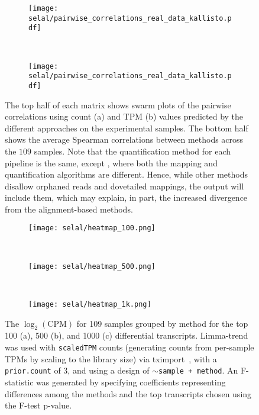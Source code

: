 \begin{figure}[h!]
    \centering
    \begin{subfigure}[t]{0.7\textwidth}
        \centering
  	  	 \texttt{[image: selal/pairwise\_correlations\_real\_data\_kallisto.pdf]}
		\caption{}
    \end{subfigure}
    ~ 
    \begin{subfigure}[t]{0.7\textwidth}
        \centering
  	  	\texttt{[image: selal/pairwise\_correlations\_real\_data\_kallisto.pdf]}
		\caption{}
    \end{subfigure}
    \caption{The top half of each matrix shows swarm plots of the pairwise correlations using count (a) and TPM (b) values
        predicted by the different approaches on the experimental samples. The
        bottom half shows the average Spearman correlations between methods
        across the $109$ samples. Note that the quantification method for each
        pipeline is the same, except \kallisto, where both the mapping and
        quantification algorithms are different. Hence, while other methods
        disallow orphaned reads and dovetailed mappings, the \kallisto output
        will include them, which may explain, in part, the increased divergence
        from the alignment-based methods.}
    \label{fig:kallisto}
\end{figure}

\begin{figure}[t!]
    \centering
    \begin{subfigure}[t]{0.45\textwidth}
        \centering
	    \texttt{[image: selal/heatmap\_100.png]}
	    \caption{}
    \end{subfigure}
    ~
    \begin{subfigure}[t]{0.45\textwidth}
        \centering
	    \texttt{[image: selal/heatmap\_500.png]}
	    \caption{}
    \end{subfigure}
    ~
     \begin{subfigure}[t]{0.45\textwidth}
     \centering
	    \texttt{[image: selal/heatmap\_1k.png]}
	    \caption{}
    \end{subfigure}
    \caption{The $\log_2(\text{CPM})$ for 109 samples grouped by
      method for the top 100 (a), 500 (b), and 1000 (c) differential transcripts. 
      Limma-trend was used with \texttt{scaledTPM} counts 
	(generating counts from per-sample TPMs by scaling to the library size) via
	tximport~\citep{soneson2015differential}, with a \texttt{prior.count} of
	3, and using a design of \texttt{$\sim$sample + method}. An F-statistic was
	generated by specifying coefficients representing differences among the methods
	and the top transcripts chosen using the F-test p-value.}
      \label{fig:heatmap}
\end{figure}

